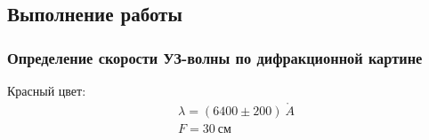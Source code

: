 \documentclass{lab}
\renewcommand{\AA}{\ensuremath{\mathring{A}}}
\begin{document}
\newpage

\subsection*{Выполнение работы}

\subsubsection*{Определение скорости УЗ-волны по дифракционной картине}

Красный цвет:
\begin{equation}
\begin{aligned}
&\lambda = (6400 \pm 200)~\AA\\
&F = 30~см
\end{aligned}
\end{equation}
\end{document}
